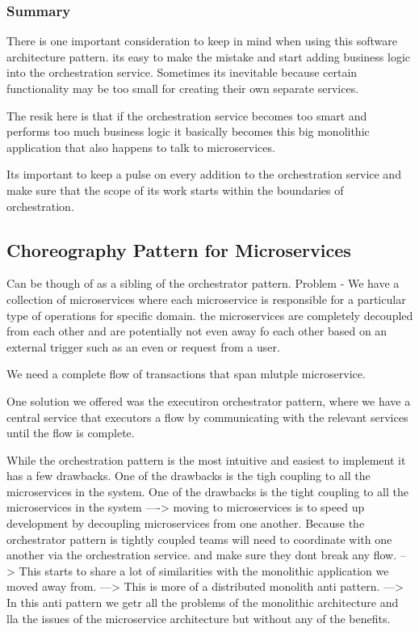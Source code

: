 \documentclass[a4paper, 11pt]{book}
\begin{document}
    \subsubsection{Summary}
    There is one important consideration to keep in mind when using this software architecture pattern.
    its easy to make the mistake and start adding business logic into the orchestration service.
    Sometimes its inevitable because certain functionality may be too small for creating their own separate services.

    The resik here is that if the orchestration service becomes too smart and performs too much business logic it basically becomes this big monolithic application that also happens to talk to microservices.

    Its important to keep a pulse on every addition to the orchestration service and make sure that the scope of its work starts within the boundaries of orchestration.

    \subsection{Choreography Pattern for Microservices}
    Can be though of as a sibling of the orchestrator pattern.
    Problem - We have a collection of microservices where each microservice is responsible for a particular type of operations for specific domain.
    the microservices are completely decoupled from each other and are potentially not even away fo each other based on an external trigger such as an even or request from a user.

    We need a complete flow of transactions that span mlutple microservice.

    One solution we offered was the executiron orchestrator pattern, where we have a central service that executors a flow by communicating with the relevant services until the flow is complete.

    While the orchestration pattern is the most intuitive and easiest to implement it has a few drawbacks.
    One of the drawbacks is the tigh coupling to all the microservices in the system.
    One of the drawbacks is the tight coupling to all the microservices in the system
    ----> moving to microservices is to speed up development by decoupling microservices from one another.
    Because the orchestrator pattern is tightly coupled teams will need to coordinate with one another via the orchestration service. and make sure they dont break any flow.
    --> This starts to share a lot of similarities with the monolithic application we moved away from.
    ---> This is more of a distributed monolith anti pattern.
    ---> In this anti pattern we getr all the problems of the monolithic architecture and lla the issues of the microservice architecture but without any of the benefits.
\end{document}
